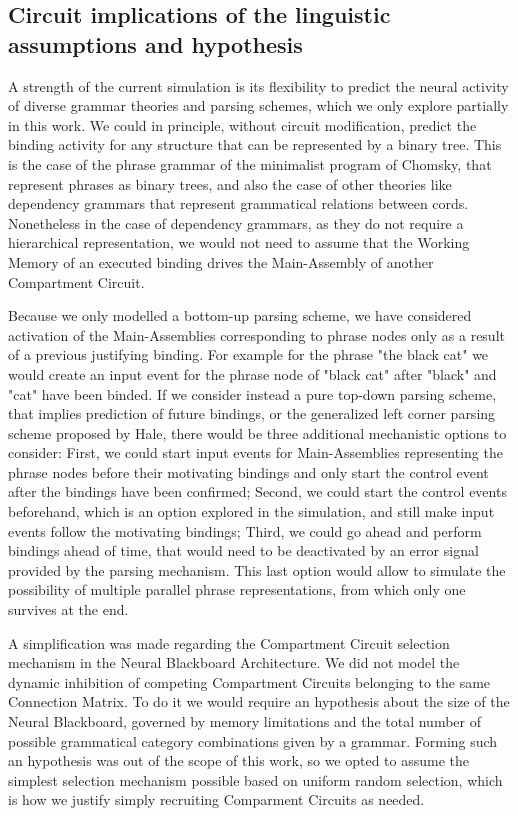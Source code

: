 \documentclass[10pt]{article}
\begin{document}
\subsection{Circuit implications of the linguistic assumptions and hypothesis}

A strength of the current simulation is its flexibility to predict the neural activity of diverse grammar theories and parsing schemes, which we only explore partially in this work.
We could in principle, without circuit modification, predict the binding activity for any structure that can be represented by a binary tree.
This is the case of the phrase grammar of the minimalist program of Chomsky\cite{Chomsky_2014}, that represent phrases as binary trees, and also the case of other theories like dependency grammars\cite{nivre2005dependency} that represent grammatical relations between cords.
Nonetheless in the case of dependency grammars, as they do not require a hierarchical representation, we would not need to assume that the Working Memory of an executed binding drives the Main-Assembly of another Compartment Circuit.

Because we only modelled a bottom-up parsing scheme, we have considered activation of the Main-Assemblies corresponding to phrase nodes only as a result of a previous justifying binding.
For example for the phrase "the black cat" we would create an input event for the phrase node of "black cat" after "black" and "cat" have been binded.
If we consider instead a pure top-down parsing scheme, that implies prediction of future bindings, or the generalized left corner parsing scheme proposed by Hale\cite{hale2014automaton}, there would be three additional mechanistic options to consider:
First, we could start input events for Main-Assemblies representing the phrase nodes before their motivating bindings and only start the control event after the bindings have been confirmed;
Second, we could start the control events beforehand, which is an option explored in the simulation, and still make input events follow the motivating bindings;
Third, we could go ahead and perform bindings ahead of time, that would need to be deactivated by an error signal provided by the parsing mechanism. This last option would allow to simulate the possibility of multiple parallel phrase representations, from which only one survives at the end.

A simplification was made regarding the Compartment Circuit selection mechanism in the Neural Blackboard Architecture.
We did not model the dynamic inhibition of competing Compartment Circuits belonging to the same Connection Matrix.
To do it we would require an hypothesis about the size of the Neural Blackboard, governed by memory limitations and the total number of possible grammatical category combinations given by a grammar.
Forming such an hypothesis was out of the scope of this work, so we opted to assume the simplest selection mechanism possible based on uniform random selection, which is how we justify simply recruiting Comparment Circuits as needed.
\end{document}
